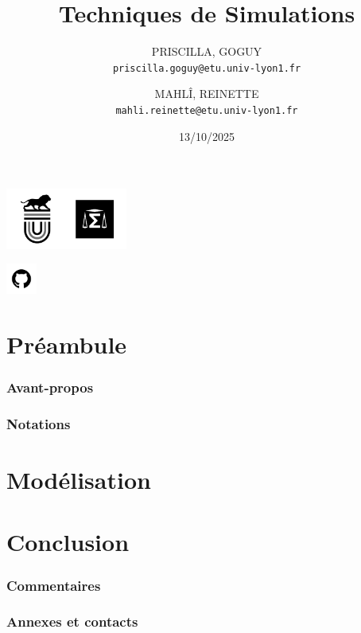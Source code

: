 \documentclass[10pt,a4paper]{article}
\title{Techniques de Simulations}
\author{
  PRISCILLA, GOGUY\\
  \texttt{priscilla.goguy@etu.univ-lyon1.fr}
  \and
  MAHLÎ, REINETTE\\
  \texttt{mahli.reinette@etu.univ-lyon1.fr}
}
\date{13/10/2025}
\begin{document}
\pagecolor{black!20}
\maketitle

\begin{center}
\includegraphics[width=4cm,height=2cm]{img1}

\href{https://github.com/LaboiteNoire/techniques-de-simulations-}{\includegraphics[width=1cm,height=1cm]{img2}}

\end{center}


\newpage

\phantom{aaaaaa}

\tableofcontents

\part{Préambule}
\section{Avant-propos}
\section{Notations}

\part{Modélisation}


\part{Conclusion}
\section{Commentaires}
\section{Annexes et contacts}
\end{document}
